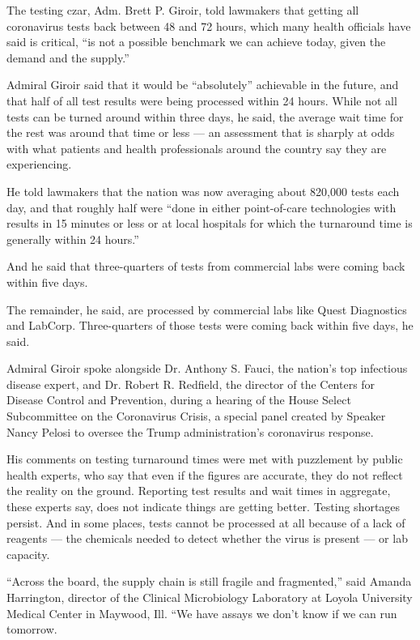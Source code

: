 The testing czar, Adm. Brett P. Giroir, told lawmakers that getting all
coronavirus tests back between 48 and 72 hours, which many health
officials have said is critical, ``is not a possible benchmark we can
achieve today, given the demand and the supply.''

Admiral Giroir said that it would be ``absolutely'' achievable in the
future, and that half of all test results were being processed within 24
hours. While not all tests can be turned around within three days, he
said, the average wait time for the rest was around that time or less
--- an assessment that is sharply at odds with what patients and health
professionals around the country say they are experiencing.

He told lawmakers that the nation was now averaging about 820,000 tests
each day, and that roughly half were ``done in either point-of-care
technologies with results in 15 minutes or less or at local hospitals
for which the turnaround time is generally within 24 hours.''

And he said that three-quarters of tests from commercial labs were
coming back within five days.

The remainder, he said, are processed by commercial labs like Quest
Diagnostics and LabCorp. Three-quarters of those tests were coming back
within five days, he said.

Admiral Giroir spoke alongside Dr. Anthony S. Fauci, the nation's top
infectious disease expert, and Dr. Robert R. Redfield, the director of
the Centers for Disease Control and Prevention, during a hearing of the
House Select Subcommittee on the Coronavirus Crisis, a special panel
created by Speaker Nancy Pelosi to oversee the Trump administration's
coronavirus response.

His comments on testing turnaround times were met with puzzlement by
public health experts, who say that even if the figures are accurate,
they do not reflect the reality on the ground. Reporting test results
and wait times in aggregate, these experts say, does not indicate things
are getting better. Testing shortages persist. And in some places, tests
cannot be processed at all because of a lack of reagents --- the
chemicals needed to detect whether the virus is present --- or lab
capacity.

``Across the board, the supply chain is still fragile and fragmented,''
said Amanda Harrington, director of the Clinical Microbiology Laboratory
at Loyola University Medical Center in Maywood, Ill. ``We have assays we
don't know if we can run tomorrow.

